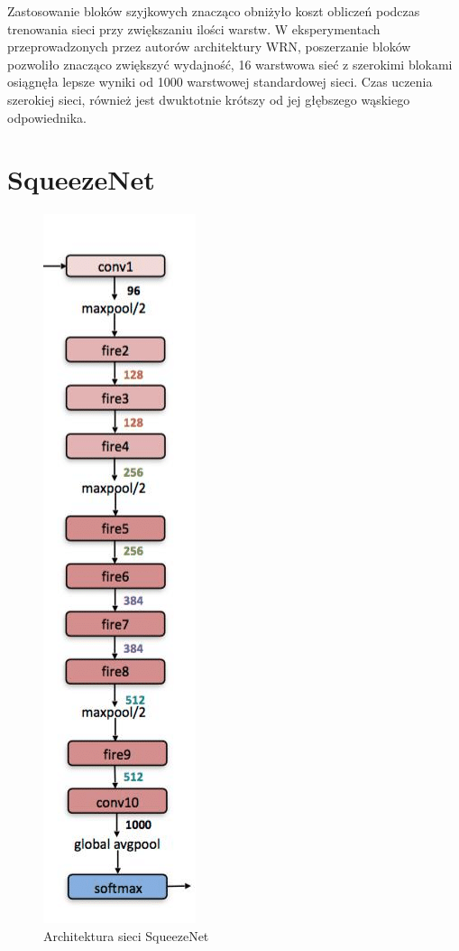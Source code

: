 \documentclass[12pt,a4paper,twoside,titlepage,openright]{book}
\begin{document}
Zastosowanie bloków szyjkowych znacząco obniżyło koszt obliczeń podczas trenowania sieci przy zwiększaniu ilości warstw. W eksperymentach przeprowadzonych przez autorów architektury WRN, poszerzanie bloków pozwoliło znacząco zwiększyć wydajność, 16 warstwowa sieć z szerokimi blokami osiągnęła lepsze wyniki od 1000 warstwowej standardowej sieci. Czas uczenia szerokiej sieci, również jest dwuktotnie krótszy od jej głębszego wąskiego odpowiednika.
\cite{DBLP:journals/corr/ZagoruykoK16}

\section{SqueezeNet}
\begin{figure}[ht]
	\centering
			\includegraphics[resolution=100, scale=0.65]{SqueezeNet.png}
		\caption{Architektura sieci SqueezeNet}
\end{figure}
\end{document}

